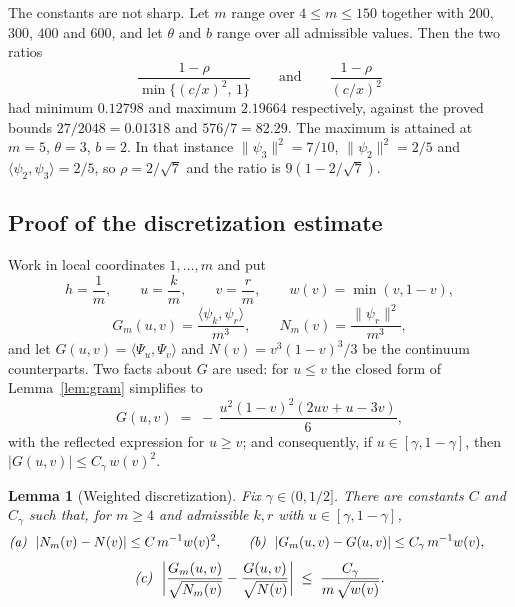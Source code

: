 \documentclass[12pt, a4paper]{article}
\newtheorem{lemma}{Lemma}[section]
\begin{document}
The constants are not sharp. Let $m$ range over $4 \le m \le 150$ together with $200$, $300$, $400$ and $600$, and let $\theta$ and $b$ range over all admissible values. Then the two ratios
\[
\frac{1-\rho}{\min\{(c/x)^2,\,1\}}
\qquad\text{and}\qquad
\frac{1-\rho}{(c/x)^2}
\]
had minimum $0.12798$ and maximum $2.19664$ respectively, against the proved bounds $27/2048 = 0.01318$ and $576/7 = 82.29$. The maximum is attained at $m = 5$, $\theta = 3$, $b = 2$. In that instance $\|\psi_3\|^2 = 7/10$, $\|\psi_2\|^2 = 2/5$ and $\langle\psi_2,\psi_3\rangle = 2/5$, so $\rho = 2/\sqrt7$ and the ratio is $9(1-2/\sqrt7)$.

\subsection{Proof of the discretization estimate}
\label{sup:discproof}

Work in local coordinates $1,\ldots,m$ and put
\[
h = \frac1m, \qquad u = \frac{k}{m}, \qquad v = \frac{r}{m}, \qquad w(v) = \min(v,1-v),
\]
\[
G_m(u,v) = \frac{\langle\psi_k,\psi_r\rangle}{m^3}, \qquad
N_m(v) = \frac{\|\psi_r\|^2}{m^3},
\]
and let $G(u,v) = \langle\Psi_u,\Psi_v\rangle$ and $N(v) = v^3(1-v)^3/3$ be the
continuum counterparts. Two facts about $G$ are used: for $u \le v$ the closed
form of Lemma~\ref{lem:gram} simplifies to
\begin{equation}
\label{eq:Gsimple}
G(u,v) \;=\; -\,\frac{u^2(1-v)^2(2uv+u-3v)}{6} ,
\end{equation}
with the reflected expression for $u \ge v$; and consequently, if
$u \in [\gamma, 1-\gamma]$, then $|G(u,v)| \le C_\gamma\, w(v)^2$.

\begin{lemma}[Weighted discretization]
\label{lem:weighted}
Fix $\gamma\in(0,1/2]$. There are constants $C$ and $C_\gamma$ such that,
for $m\ge4$ and admissible $k,r$ with $u\in[\gamma,1-\gamma]$,
\[
\text{\emph{(a)}}\ \ |N_m(v) - N(v)| \le C\,m^{-1} w(v)^2, \qquad
\text{\emph{(b)}}\ \ |G_m(u,v) - G(u,v)| \le C_\gamma\, m^{-1} w(v), \qquad
\]
\[
\text{\emph{(c)}}\ \
\bigg| \frac{G_m(u,v)}{\sqrt{N_m(v)}} - \frac{G(u,v)}{\sqrt{N(v)}} \bigg|
\;\le\; \frac{C_\gamma}{m\,\sqrt{w(v)}} .
\]
\end{lemma}
\end{document}
